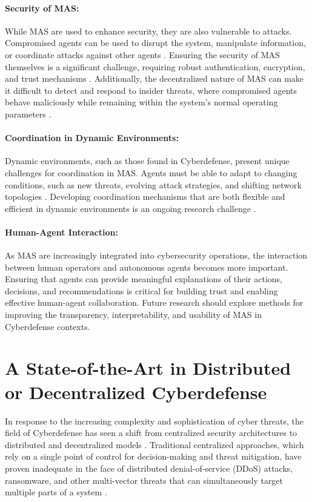 \paragraph{Security of MAS:}
While MAS are used to enhance security, they are also vulnerable to attacks. Compromised agents can be used to disrupt the system, manipulate information, or coordinate attacks against other agents \cite{kolias2011swarm}. Ensuring the security of MAS themselves is a significant challenge, requiring robust authentication, encryption, and trust mechanisms \cite{kolias2011swarm}. Additionally, the decentralized nature of MAS can make it difficult to detect and respond to insider threats, where compromised agents behave maliciously while remaining within the system's normal operating parameters \cite{kolias2011swarm}.

\paragraph{Coordination in Dynamic Environments:}
Dynamic environments, such as those found in Cyberdefense, present unique challenges for coordination in MAS. Agents must be able to adapt to changing conditions, such as new threats, evolving attack strategies, and shifting network topologies \cite{kolias2011swarm}. Developing coordination mechanisms that are both flexible and efficient in dynamic environments is an ongoing research challenge \cite{kolias2011swarm}.

\paragraph{Human-Agent Interaction:}
As MAS are increasingly integrated into cybersecurity operations, the interaction between human operators and autonomous agents becomes more important. Ensuring that agents can provide meaningful explanations of their actions, decisions, and recommendations is critical for building trust and enabling effective human-agent collaboration. Future research should explore methods for improving the transparency, interpretability, and usability of MAS in Cyberdefense contexts.



\section{A State-of-the-Art in Distributed or Decentralized Cyberdefense}

In response to the increasing complexity and sophistication of cyber threats, the field of Cyberdefense has seen a shift from centralized security architectures to distributed and decentralized models \cite{Chen2021, Misra2023}. Traditional centralized approaches, which rely on a single point of control for decision-making and threat mitigation, have proven inadequate in the face of distributed denial-of-service (DDoS) attacks, ransomware, and other multi-vector threats that can simultaneously target multiple parts of a system \cite{Munsing2018}.

